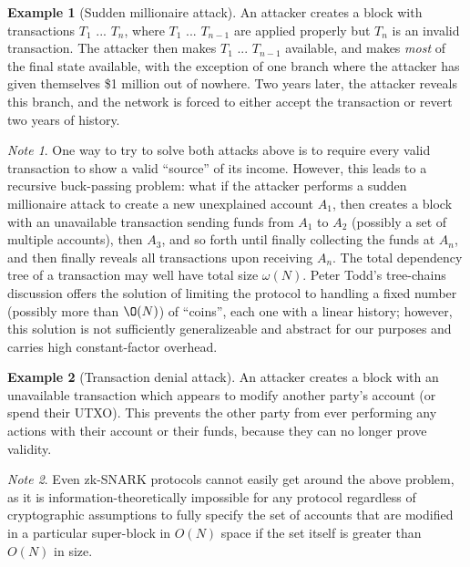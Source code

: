\documentclass[11pt,a4paper]{article}
\theoremstyle{plain}
\theoremstyle{definition}
\newtheorem{exmp}{Example}[section]
\theoremstyle{remark}
\newtheorem*{note}{Note}
\begin{document}
\begin{exmp}[Sudden millionaire attack]
An attacker creates a block with transactions $T_1$ ... $T_n$, where $T_1$ ... $T_{n-1}$ are applied properly but $T_n$ is an invalid transaction. The attacker then makes $T_1$ ... $T_{n-1}$ available, and makes \emph{most} of the final state available, with the exception of one branch where the attacker has given themselves \$1 million out of nowhere. Two years later, the attacker reveals this branch, and the network is forced to either accept the transaction or revert two years of history.
\end{exmp}

\begin{note}
One way to try to solve both attacks above is to require every valid transaction to show a valid ``source'' of its income. However, this leads to a recursive buck-passing problem: what if the attacker performs a sudden millionaire attack to create a new unexplained account $A_1$, then creates a block with an unavailable transaction sending funds from $A_1$ to $A_2$ (possibly a set of multiple accounts), then $A_3$, and so forth until finally collecting the funds at $A_n$, and then finally reveals all transactions upon receiving $A_n$. The total dependency tree of a transaction may well have total size $\omega(N)$. Peter Todd's tree-chains discussion offers the solution\cite{treechains} of limiting the protocol to handling a fixed number (possibly more than $\O(N)$) of ``coins'', each one with a linear history; however, this solution is not sufficiently generalizeable and abstract for our purposes and carries high constant-factor overhead.
\end{note}

\begin{exmp}[Transaction denial attack]
An attacker creates a block with an unavailable transaction which appears to modify another party's account (or spend their UTXO). This prevents the other party from ever performing any actions with their account or their funds, because they can no longer prove validity.
\end{exmp}

\begin{note}
Even zk-SNARK protocols cannot easily get around the above problem, as it is information-theoretically impossible for any protocol regardless of cryptographic assumptions to fully specify the set of accounts that are modified in a particular super-block in $O(N)$ space if the set itself is greater than $O(N)$ in size.
\end{note}
\end{document}
